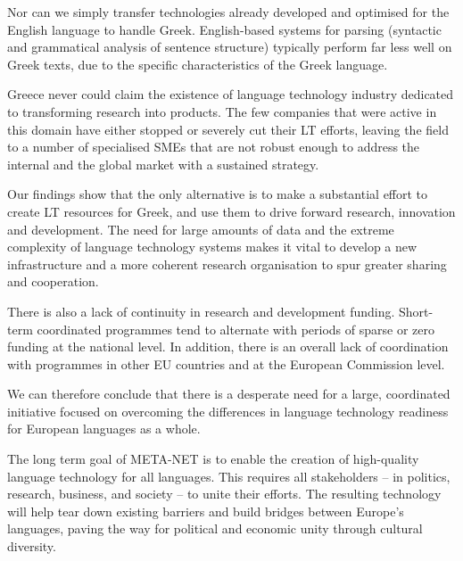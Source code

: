 \begin{multicols}{2}
Nor can we simply transfer technologies already developed and optimised for the English language to handle Greek. English-based systems for parsing (syntactic and grammatical analysis of sentence structure) typically perform far less well on Greek texts, due to the specific characteristics of the Greek language.

Greece never could claim the existence of language technology industry dedicated to transforming research into products. The few companies that were active in this domain have either stopped or severely cut their LT efforts, leaving the field to a number of specialised SMEs that are not robust enough to address the internal and the global market with a sustained strategy. 

Our findings show that the only alternative is to make a substantial effort to create LT resources for Greek, and use them to drive forward research, innovation and development. The need for large amounts of data and the extreme complexity of language technology systems makes it vital to develop a new infrastructure and a more coherent research organisation to spur greater sharing and cooperation.

There is also a lack of continuity in research and development funding. Short-term coordinated programmes tend to alternate with periods of sparse or zero funding at the national level. In addition, there is an overall lack of coordination with programmes in other EU countries and at the European Commission level.

We can therefore conclude that there is a desperate need for a large, coordinated initiative focused on overcoming the differences in language technology readiness for European languages as a whole.

The long term goal of META-NET is to enable the creation of high-quality language technology for all languages. This requires all stakeholders -- in politics, research, business, and society -- to unite their efforts. The resulting technology will help tear down existing barriers and build bridges between Europe’s languages, paving the way for political and economic unity through cultural diversity.  \end{multicols}

\clearpage

